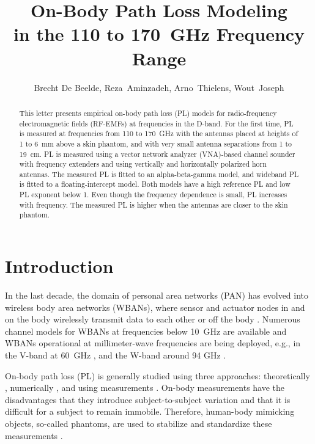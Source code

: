 \documentclass[preprint]{rsl}
\title{On-Body Path Loss Modeling\\ in the 110 to 170~GHz Frequency Range}
\author{Brecht De Beelde,
Reza~Aminzadeh,
Arno~Thielens,
Wout~Joseph
}
\begin{document}
\maketitle

%
%

\begin{abstract}
This letter presents empirical on-body path loss (PL) models for radio-frequency electromagnetic fields (RF-EMFs) at frequencies in the D-band. 
For the first time, PL is measured at frequencies from 110 to 170~GHz with the antennas placed at heights of 1 to 6~mm above a skin phantom, and with very small antenna separations from 1 to 19~cm.
PL is measured using a vector network analyzer (VNA)-based channel sounder with frequency extenders and using vertically and horizontally polarized horn antennas. 
The measured PL is fitted to an alpha-beta-gamma model, and wideband PL is fitted to a floating-intercept model.
Both models have a high reference PL and low PL exponent below 1. 
Even though the frequency dependence is small, PL increases with frequency. 
The measured PL is higher when the antennas are closer to the skin phantom.
\end{abstract}

\section{Introduction\label{sect:intro}}

In the last decade, the domain of personal area networks (PAN) has evolved into wireless body area networks (WBANs), where sensor and actuator nodes in and on the body wirelessly transmit data to each other \cite{Patel2010} or off the body \cite{Marinova2015}. 
Numerous channel models for WBANs at frequencies below 10~GHz are available \cite{VanRoy2010} and WBANs operational at millimeter-wave frequencies are being deployed, e.g., in the V-band at 60~GHz \cite{Chahat2013,Petrillo2014,Aminzadeh2021_tap}, and the W-band around 94 GHz \cite{Brizzi2013,Ali2022}.

On-body path loss (PL) is generally studied using three approaches: theoretically \cite{Chahat2013,Petrillo2014}, numerically \cite{Reusens2009}, and using measurements \cite{Chahat2013,Reusens2009,Aminzadeh2021_tap}. 
On-body measurements have the disadvantages that they introduce subject-to-subject variation \cite{Proesmans2022} and that it is difficult for a subject to remain immobile. 
Therefore, human-body mimicking objects, so-called phantoms, are used to stabilize and standardize these measurements \cite{Chahat2013}. 
\end{document}
